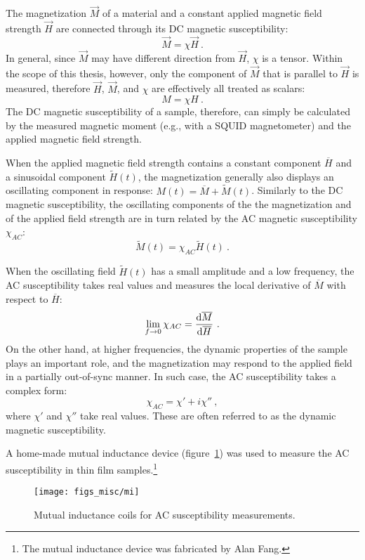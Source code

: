 The magnetization $\vec{M}$ of a material and a constant applied magnetic field strength $\vec{H}$ are connected through its DC magnetic susceptibility:
\begin{equation}%
    \vec{M} = \chi\vec{H}~.%
\end{equation}%
%
In general, since $\vec{M}$ may have different direction from $\vec{H}$, $\chi$ is a tensor. Within the scope of this thesis, however, only the component of $\vec{M}$ that is parallel to $\vec{H}$ is measured, therefore $\vec{H}$, $\vec{M}$, and $\chi$ are effectively all treated as scalars:
\begin{equation}%
    M = \chi{}H~.%
\end{equation}%
%
The DC magnetic susceptibility of a sample, therefore, can simply be calculated by the measured magnetic moment (e.g., with a SQUID magnetometer) and the applied magnetic field strength.

When the applied magnetic field strength contains a constant component $\overline{H}$ and a sinusoidal component $\widetilde{H}(t)$, the magnetization generally also displays an oscillating component in response: $M(t) = \overline{M} + \widetilde{M}(t)$. Similarly to the DC magnetic susceptibility, the oscillating components of the the magnetization and of the applied field strength are in turn related by the AC magnetic susceptibility $\chi_{AC}$:
\begin{equation}%
    \widetilde{M}(t) = \chi_{AC}\widetilde{H}(t)~.%
\end{equation}%

When the oscillating field $\widetilde{H}(t)$ has a small amplitude and a low frequency, the AC susceptibility takes real values and measures the local derivative of $\overline{M}$ with respect to $\overline{H}$:%
\begin{equation}%
    \lim\limits_{f \to 0}\chi_{AC} = \frac{\diff\overline{M}}{\diff\overline{H}}~.%
\end{equation}%
%
On the other hand, at higher frequencies, the dynamic properties of the sample plays an important role, and the magnetization may respond to the applied field in a partially out-of-sync manner. In such case, the AC susceptibility takes a complex form:%
\begin{equation}%
    \chi_{AC} = \chi' + i\chi''~,%
\end{equation}%
where $\chi'$ and $\chi''$ take real values. These are often referred to as the dynamic magnetic susceptibility.

A home-made mutual inductance device (figure~\ref{fig:mi_sketch}) was used to measure the AC susceptibility in thin film samples.\footnote{The mutual inductance device was fabricated by Alan Fang.} %
\begin{figure}[ht]%
	\centering%
    \texttt{[image: figs\_misc/mi]}%
    \caption[Mutual inductance coils for AC susceptibility measurements.]{\label{fig:mi_sketch}Mutual inductance coils for AC susceptibility measurements.}%
\end{figure}%
%
